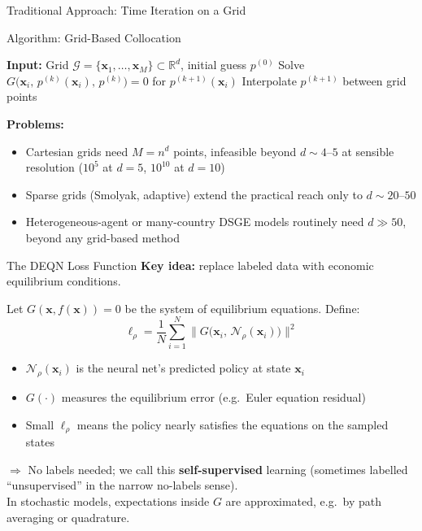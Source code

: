 \documentclass[aspectratio=169,11pt]{beamer}
\newcommand{\emphc}[1]{\textcolor{harvardcrimson}{#1}}
\newcommand{\x}{\bm{x}}
\newcommand{\R}{\mathbb{R}}
\begin{document}
\begin{frame}{Traditional Approach: Time Iteration on a Grid}
\begin{alertblock}{Algorithm: Grid-Based Collocation}
\begin{algorithmic}
\small
\STATE \textbf{Input:} Grid $\mathcal{G} = \{\x_1, \ldots, \x_M\} \subset \R^d$, initial guess $p^{(0)}$
    \FOR{each grid point $\x_i \in \mathcal{G}$}
        \STATE Solve $G\bigl(\x_i,\, p^{(k)}(\x_i),\, p^{(k)}\bigr) = 0$ for $p^{(k+1)}(\x_i)$
    \ENDFOR
    \STATE Interpolate $p^{(k+1)}$ between grid points
\ENDFOR
\end{algorithmic}
\end{alertblock}

\vspace{0.3em}
\textbf{Problems:}
\begin{itemize}
    \item \emphc{Cartesian} grids need $M=n^d$ points, infeasible beyond $d\sim4\text{--}5$ at sensible resolution ($10^5$ at $d\!=\!5$, $10^{10}$ at $d\!=\!10$)
    \item \emphc{Sparse grids} (Smolyak, adaptive) extend the practical reach only to $d \sim 20\text{--}50$
    \item Heterogeneous-agent or many-country DSGE models routinely need $d \gg 50$, beyond any grid-based method
\end{itemize}
\end{frame}

\begin{frame}{The DEQN Loss Function}
\textbf{Key idea:} replace labeled data with \emphc{economic equilibrium conditions}.

\vspace{0.5em}
Let $G(\x, f(\x)) = 0$ be the system of equilibrium equations. Define:
\[
\boxed{
\ell_\rho = \frac{1}{N} \sum_{i=1}^{N} \bigl\| G\bigl(\x_i,\, \mathcal{N}_\rho(\x_i)\bigr) \bigr\|^2
}
\]

\vspace{0.3em}
\begin{itemize}
    \item $\mathcal{N}_\rho(\x_i)$ is the neural net's \emphc{predicted policy} at state $\x_i$
    \item $G(\cdot)$ measures the \emphc{equilibrium error} (e.g.\ Euler equation residual)
    \item Small $\ell_\rho$ means the policy nearly satisfies the equations on the sampled states
\end{itemize}

\vspace{0.5em}
$\Rightarrow$ \emphc{No labels needed}; we call this \textbf{self-supervised} learning (sometimes labelled ``unsupervised'' in the narrow no-labels sense).
\\[2pt]
{\scriptsize In stochastic models, expectations inside $G$ are approximated, e.g.\ by path averaging or quadrature.}
\end{frame}
\end{document}

